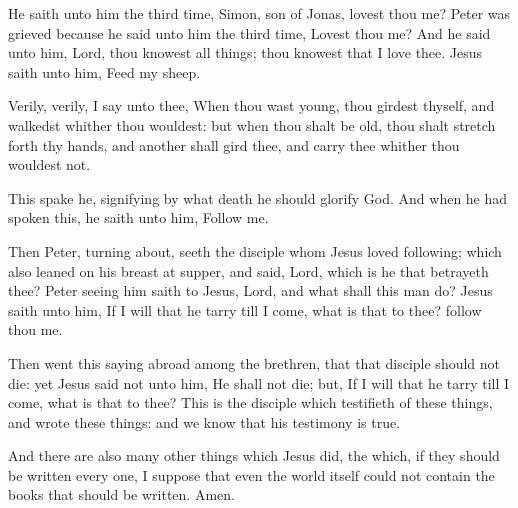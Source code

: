 \Verse He saith unto him the third time, Simon, son of Jonas, lovest thou me? Peter was grieved because he said unto him the third time, Lovest thou me? And he said unto him, Lord, thou knowest all things; thou knowest that I love thee. Jesus saith unto him, Feed my sheep.

\Verse Verily, verily, I say unto thee, When thou wast young, thou girdest thyself, and walkedst whither thou wouldest: but when thou shalt be old, thou shalt stretch forth thy hands, and another shall gird thee, and carry thee whither thou wouldest not.

\Verse This spake he, signifying by what death he should glorify God.  And when he had spoken this, he saith unto him, Follow me.

\Verse Then Peter, turning about, seeth the disciple whom Jesus loved following; which also leaned on his breast at supper, and said, Lord, which is he that betrayeth thee?  \Verse Peter seeing him saith to Jesus, Lord, and what shall this man do?  \Verse Jesus saith unto him, If I will that he tarry till I come, what is that to thee? follow thou me.

\Verse Then went this saying abroad among the brethren, that that disciple should not die: yet Jesus said not unto him, He shall not die; but, If I will that he tarry till I come, what is that to thee?  \Verse This is the disciple which testifieth of these things, and wrote these things: and we know that his testimony is true.

\Verse And there are also many other things which Jesus did, the which, if they should be written every one, I suppose that even the world itself could not contain the books that should be written. Amen.

